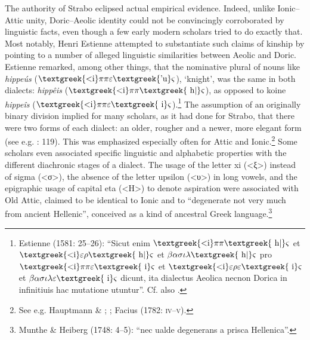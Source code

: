\documentclass[output=paper]{langsci/langscibook}
\begin{document}
The authority of Strabo eclipsed actual empirical evidence. Indeed, unlike Ionic–Attic unity, Doric–Aeolic identity could not be convincingly corroborated by linguistic facts, even though a few early modern scholars tried to do exactly that. Most notably, Henri Estienne attempted to substantiate such claims of kinship by pointing to a number of alleged linguistic similarities between Aeolic and Doric. Estienne remarked, among other things, that the nominative plural of nouns like \textit{hippeús} ($\text{\textgreek{<i}}\pi \pi \varepsilon \text{\textgreek{'u}}\varsigma $), ‘knight’, was the same in both dialects: \textit{hippêis} ($\text{\textgreek{<i}}\pi \pi \text{\textgreek{~h|}}\varsigma $), as opposed to koine \textit{hippeîs} ($\text{\textgreek{<i}}\pi \pi \varepsilon \text{\textgreek{~i}}\varsigma $).\footnote{Estienne (1581: 25–26): “Sicut enim $\text{\textgreek{<i}}\pi \pi \text{\textgreek{~h|}}\varsigma $ et $\text{\textgreek{<i}}\varepsilon \rho \text{\textgreek{~h|}}\varsigma $ et $\beta \alpha \sigma \iota \lambda \text{\textgreek{~h|}}\varsigma $ pro $\text{\textgreek{<i}}\pi \pi \varepsilon \text{\textgreek{~i}}\varsigma $ et $\text{\textgreek{<i}}\varepsilon \rho \varepsilon \text{\textgreek{~i}}\varsigma $ et $\beta \alpha \sigma \iota \lambda \varepsilon \text{\textgreek{~i}}\varsigma $ dicunt, ita dialectus Aeolica necnon Dorica in infinitiuis hac mutatione utuntur”. Cf. also \citet[179]{Trendelenburg1782}.} The assumption of an originally binary division implied for many scholars, as it had done for Strabo, that there were two forms of each dialect: an older, rougher and a newer, more elegant form (see e.g. \citealt{Mazzocchi1754}: 119). This was emphasized especially often for Attic and Ionic.\footnote{See e.g. Hauptmann \& \citet[18]{Schmid1737}; \citet[137]{Walch1772}; Facius (1782: \textsc{iv–v}).} Some scholars even associated specific linguistic and alphabetic properties with the different diachronic stages of a dialect. The usage of the letter xi (<ξ>) instead of sigma (<σ>), the absence of the letter upsilon (<υ>) in long vowels, and the epigraphic usage of capital eta (<H>) to denote aspiration were associated with Old Attic, claimed to be identical to Ionic and to “degenerate not very much from ancient Hellenic”, conceived as a kind of ancestral Greek language.\footnote{Munthe \& Heiberg (1748: 4–5): “nec ualde degenerans a prisca Hellenica”.}
\end{document}
